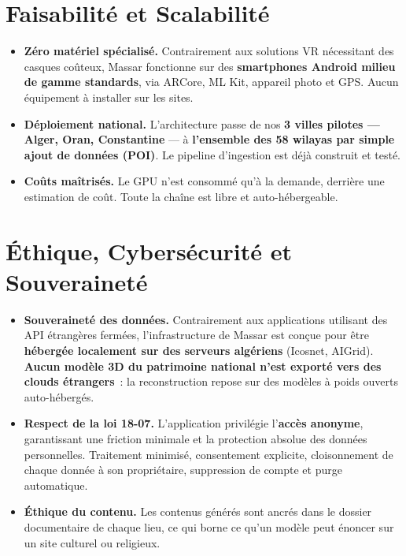 \documentclass[11pt,a4paper]{article}
\newcommand{\hrulethin}{\vspace{-0.7em}\par\noindent{\color{accent}\rule{\linewidth}{0.5pt}}\par\vspace{-0.45em}}
\begin{document}
\section{Faisabilité et Scalabilité}\hrulethin

\begin{itemize}
  \item \textbf{Zéro matériel spécialisé.} Contrairement aux solutions VR nécessitant des casques coûteux, Massar fonctionne sur des \textbf{smartphones Android milieu de gamme standards}, via ARCore, ML Kit, appareil photo et GPS. Aucun équipement à installer sur les sites.
  \item \textbf{Déploiement national.} L'architecture passe de nos \textbf{3 villes pilotes — Alger, Oran, Constantine} — à \textbf{l'ensemble des 58 wilayas par simple ajout de données (POI)}. Le pipeline d'ingestion est déjà construit et testé.
  \item \textbf{Coûts maîtrisés.} Le GPU n'est consommé qu'à la demande, derrière une estimation de coût. Toute la chaîne est libre et auto-hébergeable.
\end{itemize}

\section{Éthique, Cybersécurité et Souveraineté}\hrulethin

\begin{itemize}
  \item \textbf{Souveraineté des données.} Contrairement aux applications utilisant des API étrangères fermées, l'infrastructure de Massar est conçue pour être \textbf{hébergée localement sur des serveurs algériens} (Icosnet, AIGrid). \textbf{Aucun modèle 3D du patrimoine national n'est exporté vers des clouds étrangers}~: la reconstruction repose sur des modèles à poids ouverts auto-hébergés.
  \item \textbf{Respect de la loi 18-07.} L'application privilégie l'\textbf{accès anonyme}, garantissant une friction minimale et la protection absolue des données personnelles. Traitement minimisé, consentement explicite, cloisonnement de chaque donnée à son propriétaire, suppression de compte et purge automatique.
  \item \textbf{Éthique du contenu.} Les contenus générés sont ancrés dans le dossier documentaire de chaque lieu, ce qui borne ce qu'un modèle peut énoncer sur un site culturel ou religieux.
\end{itemize}
\end{document}
